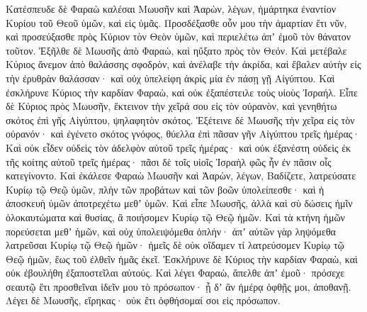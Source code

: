 {\par }{\PP {}Κατέσπευδε δὲ Φαραὼ καλέσαι Μωυσῆν καὶ Ἀαρὼν, λέγων, ἡμάρτηκα ἐναντίον Κυρίου τοῦ Θεοῦ ὑμῶν, καὶ εἰς ὑμᾶς.
Προσδέξασθε οὖν μου τὴν ἁμαρτίαν ἔτι νῦν, καὶ προσεύξασθε πρὸς Κύριον τὸν Θεὸν ὑμῶν, καὶ περιελέτω ἀπʼ ἐμοῦ τὸν θάνατον τοῦτον.
Ἐξῆλθε δὲ Μωυσῆς ἀπὸ Φαραὼ, καὶ ηὔξατο πρὸς τὸν Θεόν.
Καὶ μετέβαλε Κύριος ἄνεμον ἀπὸ θαλάσσης σφοδρὸν, καὶ ἀνέλαβε τὴν ἀκρίδα, καὶ ἔβαλεν αὐτὴν εἰς τὴν ἐρυθρὰν θαλάσσαν· καὶ οὐχ ὑπελείφη ἀκρὶς μία ἐν πάσῃ γῇ Αἰγύπτου.
Καὶ ἐσκλήρυνε Κύριος τὴν καρδίαν Φαραὼ, καὶ οὐκ ἐξαπέστειλε τοὺς υἱοὺς Ἰσραήλ.
Εἶπε δὲ Κύριος πρὸς Μωυσῆν, ἔκτεινον τὴν χεῖρά σου εἰς τὸν οὐρανὸν, καὶ γενηθήτω σκότος ἐπὶ γῆς Αἰγύπτου, ψηλαφητὸν σκότος.
Ἐξέτεινε δὲ Μωυσῆς τὴν χεῖρα εἰς τὸν οὐρανόν· καὶ ἐγένετο σκότος γνόφος, θύελλα ἐπὶ πᾶσαν γῆν Αἰγύπτου τρεῖς ἡμέρας·
Καὶ οὐκ εἶδεν οὐδεὶς τὸν ἀδελφὸν αὐτοῦ τρεῖς ἡμέρας· καὶ οὐκ ἐξανέστη οὐδεὶς ἐκ τῆς κοίτης αὐτοῦ τρεῖς ἡμέρας· πᾶσι δὲ τοῖς υἱοῖς Ἰσραὴλ φῶς ἦν ἐν πᾶσιν οἷς κατεγίνοντο.
Καὶ ἐκάλεσε Φαραὼ Μωυσῆν καὶ Ἀαρὼν, λέγων, Βαδίζετε, λατρεύσατε Κυρίῳ τῷ Θεῷ ὑμῶν, πλὴν τῶν προβάτων καὶ τῶν βοῶν ὑπολείπεσθε· καὶ ἡ ἀποσκευὴ ὑμῶν ἀποτρεχέτω μεθʼ ὑμῶν.
Καὶ εἶπε Μωυσῆς, ἀλλὰ καὶ σὺ δώσεις ἡμῖν ὁλοκαυτώματα καὶ θυσίας, ἂ ποιήσομεν Κυρίῳ τῷ Θεῷ ἡμῶν.
Καὶ τὰ κτήνη ἡμῶν πορεύσεται μεθʼ ἡμῶν, καὶ οὐχ ὑπολειψόμεθα ὁπλήν· ἀπʼ αὐτῶν γὰρ ληψόμεθα λατρεῦσαι Κυρίῳ τῷ Θεῷ ἡμῶν· ἡμεῖς δὲ οὐκ οἴδαμεν τί λατρεύσομεν Κυρίῳ τῷ Θεῷ ἡμῶν, ἕως τοῦ ἐλθεῖν ἡμᾶς ἐκεῖ.
Ἐσκλήρυνε δὲ Κύριος τὴν καρδίαν Φαραὼ, καὶ οὐκ ἐβουλήθη ἐξαποστεῖλαι αὐτούς.
Καὶ λέγει Φαραὼ, ἄπελθε ἀπʼ ἐμοῦ· πρόσεχε σεαυτῷ ἔτι προσθεῖναι ἰδεῖν μου τὸ πρόσωπον· ᾗ δʼ ἂν ἡμέρᾳ ὀφθῇς μοι, ἀποθανῇ.
Λέγει δὲ Μωυσῆς, εἴρηκας· οὐκ ἔτι ὀφθήσομαί σοι εἰς πρόσωπον.

}
